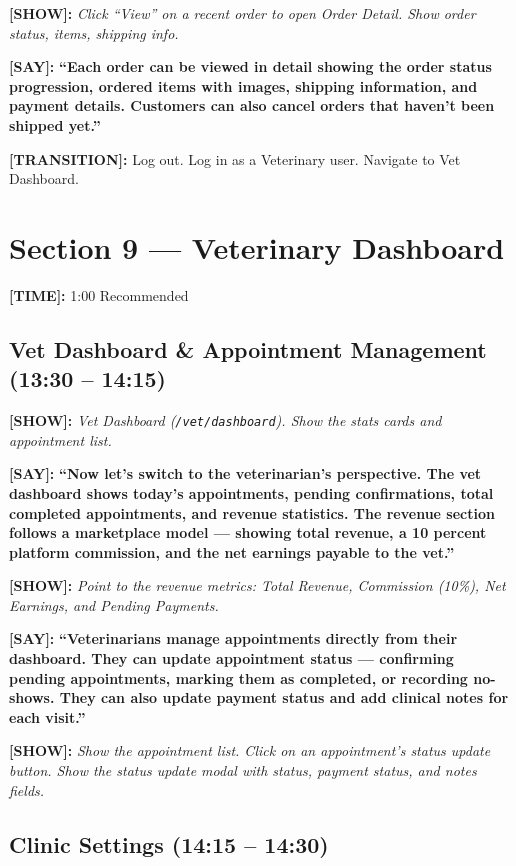 \documentclass[12pt,a4paper]{article}
\newcommand{\say}[1]{\textbf{\textcolor{narration}{[SAY]:}} \textbf{``#1''}}
\newcommand{\show}[1]{\textbf{\textcolor{screen}{[SHOW]:}} \textit{#1}}
\newcommand{\timing}[1]{\textbf{\textcolor{timing}{[TIME]:}} #1}
\newcommand{\trans}[1]{\textbf{\textcolor{transition}{[TRANSITION]:}} #1}
\begin{document}
\show{Click ``View'' on a recent order to open Order Detail. Show order status, items, shipping info.}

\say{Each order can be viewed in detail showing the order status progression, ordered items with images, shipping information, and payment details. Customers can also cancel orders that haven't been shipped yet.}

\trans{Log out. Log in as a Veterinary user. Navigate to Vet Dashboard.}

\newpage

\section{Section 9 --- Veterinary Dashboard}
\label{sec:vet-dash}

\timing{1:00} \hfill Recommended

\subsection{Vet Dashboard \& Appointment Management (13:30 -- 14:15)}

\show{Vet Dashboard (\texttt{/vet/dashboard}). Show the stats cards and appointment list.}

\say{Now let's switch to the veterinarian's perspective. The vet dashboard shows today's appointments, pending confirmations, total completed appointments, and revenue statistics. The revenue section follows a marketplace model --- showing total revenue, a 10 percent platform commission, and the net earnings payable to the vet.}

\show{Point to the revenue metrics: Total Revenue, Commission (10\%), Net Earnings, and Pending Payments.}

\say{Veterinarians manage appointments directly from their dashboard. They can update appointment status --- confirming pending appointments, marking them as completed, or recording no-shows. They can also update payment status and add clinical notes for each visit.}

\show{Show the appointment list. Click on an appointment's status update button. Show the status update modal with status, payment status, and notes fields.}

\subsection{Clinic Settings (14:15 -- 14:30)}
\end{document}
